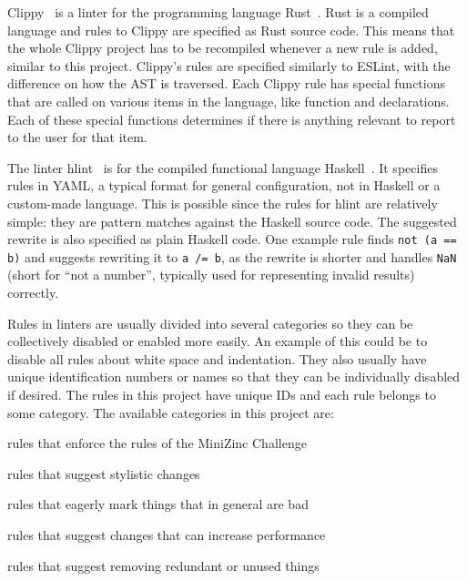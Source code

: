 \documentclass[a4paper,12pt]{article}
\begin{document}
Clippy~\cite{Clippy} is a linter for the programming language Rust~\cite{rustlang}. Rust
is a compiled language and rules to Clippy are specified as Rust source code. 
This means that the whole Clippy project has to be recompiled whenever a new rule is added,
similar to this project.
Clippy's rules are specified similarly to ESLint, with the difference
on how the AST is traversed. Each Clippy rule has special functions that are called on
various items in the language, like function and  declarations. Each of these
special functions determines if there is anything relevant to report to the user for that
item.

The linter hlint~\cite{hlint} is for the compiled functional language
Haskell~\cite{haskell}. It specifies rules in YAML, a typical format for
general configuration, not in Haskell or a custom-made language. This is possible since the rules
for hlint are relatively simple: they are pattern matches against the Haskell source code.
The suggested rewrite is also specified as plain Haskell code. One example rule finds
\texttt{not (a == b)} and suggests rewriting it to \texttt{a /= b}, as the rewrite is shorter
and handles \texttt{NaN} (short for ``not a number'', typically used for representing invalid results) correctly.

Rules in linters are usually divided into several categories so they can be collectively disabled or
enabled more easily. An example of this could be to disable all rules about white space
and indentation. They also usually have unique identification numbers or names so that they can
be individually disabled if desired. The rules in this project have unique IDs and each rule belongs
to some category.
The available categories in this project are:
\begin{description}[noitemsep]
  \item[Challenge] rules that enforce the rules of the MiniZinc Challenge
  \item[Style] rules that suggest stylistic changes
  \item[Unsure] rules that eagerly mark things that in general are bad
  \item[Performance] rules that suggest changes that can increase performance
  \item[Redundant] rules that suggest removing redundant or unused things
\end{description}
\end{document}
